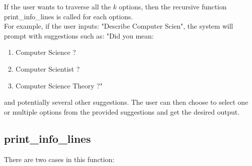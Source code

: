 \documentclass[conference]{IEEEtran}
\begin{document}
If the user wants to traverse all the $k$ options, then the recursive function print\_info\_lines is called for each options.
\\
For example, if the user inputs: "Describe Computer Scien", the system will prompt with suggestions such as:
"Did you mean:
\begin{itemize}
    
    \begin{enumerate}
        \item Computer Science ?
        \item Computer Scientist ?
        \item Computer Science Theory ?"
    \end{enumerate}
\end{itemize}
and potentially several other suggestions.
The user can then choose to select one or multiple options from the provided suggestions and get the desired output.


\subsection{\textbf{print\_info\_lines}}
There are two cases in this function:
\end{document}
